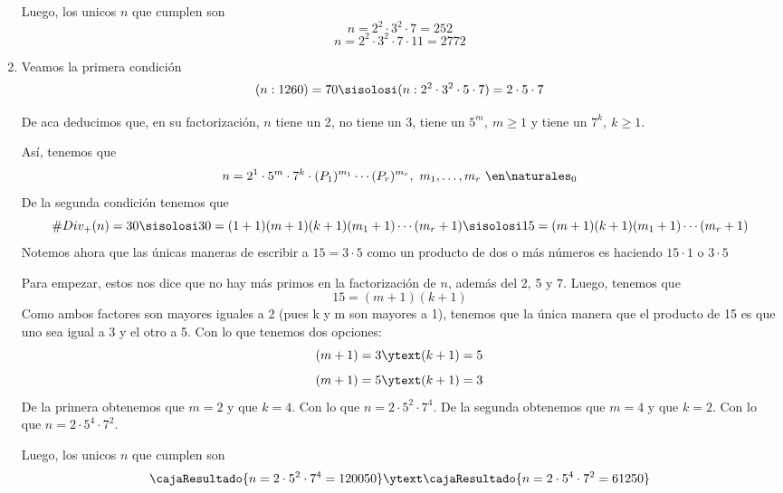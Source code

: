 \begin{enumerate}[label=(\alph*)]
        \bigskip

        Luego, los unicos $n$ que cumplen son
        $$
          n=2^2 \cdot 3^2 \cdot 7 = \boxed{252}
        $$
        $$
          n=2^2 \cdot 3^2 \cdot 7 \cdot 11 = \boxed{2772}
        $$

  \item Veamos la primera condición
        $$
          (n:1260)=70
          \sisolosi
          (n:2^2 \cdot 3^2 \cdot 5 \cdot 7 )= 2 \cdot 5 \cdot 7
        $$

        De aca deducimos que, en su factorización, $n$ tiene un 2, no tiene un 3, tiene un $5^m, ~ m \geq 1$ y tiene un $7^k, ~ k \geq 1$. \par
        Así, tenemos que
        $$
          n = 2^1 \cdot 5^m \cdot 7^k \cdot (P_1)^{m_1} \cdots (P_r)^{m_r}, ~ m_1, \dots, m_r ~ \en \naturales_0
        $$
        De la segunda condición tenemos que
        $$
          \#Div_+(n)=30
          \sisolosi
          30 = (1+1)(m+1)(k+1)(m_1+1) \cdots (m_r+1)
          \sisolosi
          15 =(m+1)(k+1)(m_1+1) \cdots (m_r+1)
        $$
        Notemos ahora que las únicas maneras de escribir a $15=3 \cdot 5$ como un producto de dos o más números es haciendo $15 \cdot 1$ o $3 \cdot 5$ \par
        Para empezar, estos nos dice que no hay más primos en la factorización de $n$, además del 2, 5 y 7. Luego, tenemos que
        $$
          15 =(m+1)(k+1)
        $$
        Como ambos factores son mayores iguales a 2 (pues k y m son mayores a 1), tenemos que la única manera que el producto de 15 es que uno sea
        igual a 3 y el otro a 5. Con lo que tenemos dos opciones:
        $$
          (m+1)= 3 \ytext (k+1)=5
        $$
        $$
          (m+1)= 5 \ytext (k+1)=3
        $$
        De la primera obtenemos que $m= 2$ y que $k=4$. Con lo que $n=2 \cdot 5^2 \cdot 7^4$.
        De la segunda obtenemos que $m= 4$ y que $k=2$. Con lo que $n=2 \cdot 5^4 \cdot 7^2$.

        \bigskip

        Luego, los unicos $n$ que cumplen son
        $$
          \cajaResultado{
            n = 2 \cdot 5^2 \cdot 7^4 = 120050
          }
          \ytext
          \cajaResultado{
            n = 2 \cdot 5^4 \cdot 7^2 = 61250
          }
        $$

\end{enumerate}

\begin{aportes}
  \item {}
\end{aportes}
